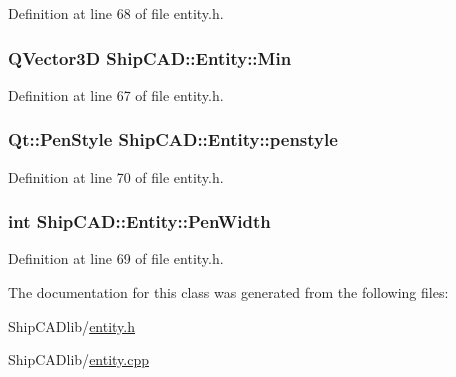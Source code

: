 Definition at line 68 of file entity.\-h.

\hypertarget{classShipCAD_1_1Entity_ac363c3a8e4d5553b98996d6114b6b148}{
\subsubsection[{Min}]{\setlength{\rightskip}{0pt plus 5cm}Q\-Vector3\-D Ship\-C\-A\-D\-::\-Entity\-::\-Min\hspace{0.3cm}{\ttfamily [read]}}}\label{classShipCAD_1_1Entity_ac363c3a8e4d5553b98996d6114b6b148}


Definition at line 67 of file entity.\-h.

\hypertarget{classShipCAD_1_1Entity_a8cbcbada188edd9d39e7c5743dc43560}{
\subsubsection[{penstyle}]{\setlength{\rightskip}{0pt plus 5cm}Qt\-::\-Pen\-Style Ship\-C\-A\-D\-::\-Entity\-::penstyle}}\label{classShipCAD_1_1Entity_a8cbcbada188edd9d39e7c5743dc43560}


Definition at line 70 of file entity.\-h.

\hypertarget{classShipCAD_1_1Entity_a95a1cc38c08e5b64a540727afb99d25a}{
\subsubsection[{Pen\-Width}]{\setlength{\rightskip}{0pt plus 5cm}int Ship\-C\-A\-D\-::\-Entity\-::\-Pen\-Width}}\label{classShipCAD_1_1Entity_a95a1cc38c08e5b64a540727afb99d25a}


Definition at line 69 of file entity.\-h.



The documentation for this class was generated from the following files\-:\begin{DoxyCompactItemize}
\item 
Ship\-C\-A\-Dlib/\hyperlink{entity_8h}{entity.\-h}\item 
Ship\-C\-A\-Dlib/\hyperlink{entity_8cpp}{entity.\-cpp}\end{DoxyCompactItemize}

